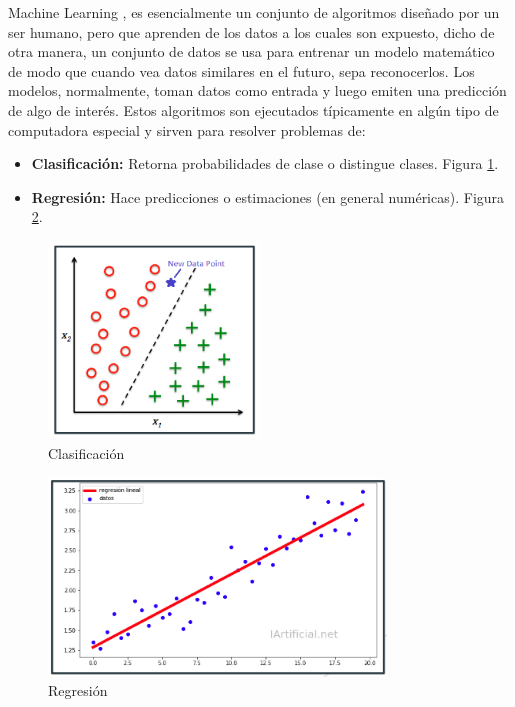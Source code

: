 Machine Learning \cite{ml}, es esencialmente un conjunto de algoritmos diseñado por un ser humano, pero que aprenden de los datos a los cuales son expuesto, dicho de otra manera, un conjunto de datos se usa para entrenar un modelo matemático de modo que cuando vea datos similares en el futuro, sepa reconocerlos. Los modelos, normalmente, toman datos como entrada y luego emiten una predicción de algo de interés. Estos algoritmos son ejecutados típicamente en algún tipo de computadora especial y sirven para resolver problemas de:
\begin{itemize}
    \item \textbf{Clasificación:} Retorna probabilidades de clase o distingue clases. Figura \ref{fig:clasificacion}.
    \item \textbf{Regresión:} Hace predicciones o estimaciones (en general numéricas). Figura \ref{fig:regresion}.
\end{itemize}

\begin{figure}[h!]
    \centering
    \includegraphics[width=0.5\textwidth]{img/clasificacion.png}
    \caption{Clasificación}
    \label{fig:clasificacion}
\end{figure}

\begin{figure}[h!]
    \centering
    \includegraphics[width=0.8\textwidth]{img/regresion.png}
    \caption{Regresión}
    \label{fig:regresion}
\end{figure}

